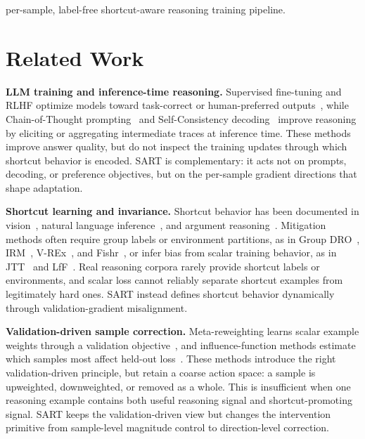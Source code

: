 per-sample, label-free shortcut-aware reasoning training pipeline.


\section{Related Work}

\textbf{LLM training and inference-time reasoning.}
Supervised fine-tuning and RLHF optimize models toward task-correct or human-preferred outputs~\cite{ouyang2022training}, while Chain-of-Thought prompting~\cite{wei2022chain,kojima2022large} and Self-Consistency decoding~\cite{wang2022self} improve reasoning by eliciting or aggregating intermediate traces at inference time. These methods improve answer quality, but do not inspect the training updates through which shortcut behavior is encoded. SART is complementary: it acts not on prompts, decoding, or preference objectives, but on the per-sample gradient directions that shape adaptation.

\textbf{Shortcut learning and invariance.}
Shortcut behavior has been documented in vision~\cite{geirhos2020shortcut}, natural language inference~\cite{mccoy2019right}, and argument reasoning~\cite{niven2019probing}. Mitigation methods often require group labels or environment partitions, as in Group DRO~\cite{sagawa2020distributionallyrobustneuralnetworks}, IRM~\cite{arjovsky2020invariantriskminimization}, V-REx~\cite{krueger2021outofdistributiongeneralizationriskextrapolation}, and Fishr~\cite{rame2022fishrinvariantgradientvariances}, or infer bias from scalar training behavior, as in JTT~\cite{liu2021justtraintwiceimproving} and LfF~\cite{nam2020learningfailuretrainingdebiased}. Real reasoning corpora rarely provide shortcut labels or environments, and scalar loss cannot reliably separate shortcut examples from legitimately hard ones. SART instead defines shortcut behavior dynamically through validation-gradient misalignment.

\textbf{Validation-driven sample correction.}
Meta-reweighting learns scalar example weights through a validation objective~\cite{ren2018learning}, and influence-function methods estimate which samples most affect held-out loss~\cite{koh2020understandingblackboxpredictionsinfluence}. These methods introduce the right validation-driven principle, but retain a coarse action space: a sample is upweighted, downweighted, or removed as a whole. This is insufficient when one reasoning example contains both useful reasoning signal and shortcut-promoting signal. SART keeps the validation-driven view but changes the intervention primitive from sample-level magnitude control to direction-level correction.


